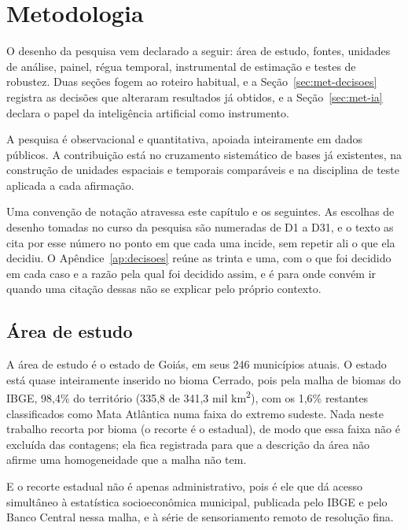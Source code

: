 \chapter{Metodologia}
\label{cap:metodologia}

O desenho da pesquisa vem declarado a seguir: área de estudo, fontes, unidades
de análise, painel, régua temporal, instrumental de estimação e testes de
robustez. Duas seções fogem ao roteiro habitual, e a
Seção~\ref{sec:met-decisoes} registra as decisões que alteraram resultados já
obtidos, e a Seção~\ref{sec:met-ia} declara o papel da inteligência
artificial como instrumento.

A pesquisa é observacional e quantitativa, apoiada inteiramente em dados
públicos. A contribuição está no cruzamento sistemático de bases já
existentes, na construção de unidades espaciais e temporais comparáveis e na
disciplina de teste aplicada a cada afirmação.

Uma convenção de notação atravessa este capítulo e os seguintes. As escolhas
de desenho tomadas no curso da pesquisa são numeradas de D1 a D31, e o texto
as cita por esse número no ponto em que cada uma incide, sem repetir ali o que
ela decidiu. O Apêndice~\ref{ap:decisoes} reúne as trinta e uma, com o que foi
decidido em cada caso e a razão pela qual foi decidido assim, e é para onde
convém ir quando uma citação dessas não se explicar pelo próprio contexto.

\section{Área de estudo}
\label{sec:met-area}

A área de estudo é o estado de Goiás, em seus 246 municípios atuais. O estado
está quase inteiramente inserido no bioma Cerrado, pois pela malha de biomas do
IBGE, 98,4\% do território (335,8 de 341,3 mil km\textsuperscript{2}), com
os 1,6\% restantes classificados como Mata Atlântica numa faixa do extremo
sudeste. Nada neste trabalho recorta por bioma (o recorte é o estadual),
de modo que essa faixa não é excluída das contagens; ela fica registrada para
que a descrição da área não afirme uma homogeneidade que a malha não tem.

E o recorte estadual não é apenas administrativo, pois é ele que dá acesso simultâneo à estatística socioeconômica municipal,
publicada pelo IBGE e pelo Banco Central nessa malha, e à série de
sensoriamento remoto de resolução fina.

